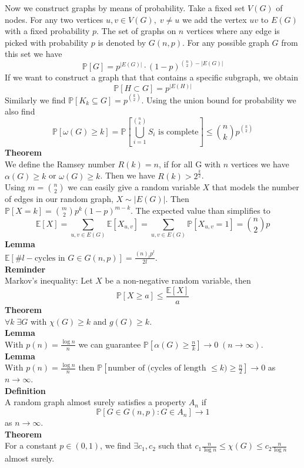 \documentclass[a4paper, 12pt]{article}
\begin{document}
	Now we construct graphs by means of probability. Take a fixed set $V(G)$ of nodes. For any two vertices $u,v \in V(G), \; v \neq u$ we add the vertex $uv$ to $E(G)$ with a fixed probability $p$. The set of graphs on $n$ vertices where any edge is picked with probability $p$ is denoted by $G(n,p)$. For any possible graph $G$ from this set we have \[\mathbb{P}[G] = p^{\left|E(G)\right|} \cdot (1-p)^{\binom{n}{2}-\left|E(G)\right|}\] 
	If we want to construct a graph that that contains a specific subgraph, we obtain \[\mathbb{P}[H \subset G] = p^{\left|E(H)\right|}\]
	Similarly we find $\mathbb{P}[K_k \subseteq G] = p^{\binom{k}{2}}$.
	Using the union bound for probability we also find \[\mathbb{P}[\omega(G)\geq k] = \mathbb{P}\left[\bigcup_{i=1}^{\binom{n}{k}} S_i \text{ is complete}\right] \leq \binom{n}{k}p^{\binom{k}{2}}\] 
	\textbf{Theorem}\\
	We define the Ramsey number $R(k) = n$, if for all G with $n$ vertices we have $\alpha(G) \geq k$ or $\omega(G) \geq k$. Then we have $R(k) > 2^\frac{k}{2}$.\\
	
	Using $m = \binom{n}{2}$ we can easily give a random variable $X$ that models the number of edges in our random graph, $X \sim \left|E(G)\right|$. Then $\mathbb{P}[X = k] = \binom{m}{2}p^k(1-p)^{m-k}$. The expected value than simplifies to \[\mathbb{E}[X] = \sum_{u,v \in E(G)} \mathbb{E}[X_{u,v}] = \sum_{u,v \in E(G)} \mathbb{P}[X_{u,v} = 1] = \binom{n}{2}p\]
	\textbf{Lemma}\\
	$\mathbb{E}[\# l-\text{cycles in } G \in G(n,p)] = \frac{(n)_lp^l}{2l}$.\\
	\textbf{Reminder}\\
	Markov's inequality: Let $X$ be a non-negative random variable, then \[\mathbb{P}[X \geq a] \leq \frac{\mathbb{E}[X]}{a}\]
	\textbf{Theorem}\\
	$\forall k \; \exists G$ with $\chi(G) \geq k$ and $g(G) \geq k$.\\
	\textbf{Lemma}\\
	With $p(n) = \frac{\log n}{n}$ we can guarantee $\mathbb{P}[\alpha(G) \geq \frac{n}{k}] \to 0 \; (n \to \infty)$.\\
	\textbf{Lemma}\\
	With $p(n) = \frac{\log n}{n}$ then $\mathbb{P}[\text{number of (cycles of length } \leq k) \geq \frac{n}{2}] \to 0$ as $n \to \infty$.\\
	\textbf{Definition}\\
	A random graph almost surely satisfies a property $A_n$ if \[\mathbb{P}[G \in G(n,p): G \in A_n] \to 1\] as $n \to \infty$.\\
	\textbf{Theorem}\\
	For a constant $p \in (0,1)$, we find $\exists c_1, c_2$ such that $c_1\frac{n}{\log n} \leq \chi(G) \leq c_2 \frac{n}{\log n}$ almost surely.
\end{document}
